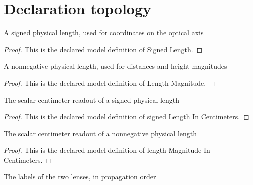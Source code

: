 \section{Declaration topology}
\begin{definition}
  \label{def:physics:phyx-mini-0043:phyxminiproblems-problemphyxmini0043-signedlength}
  A signed physical length, used for coordinates on the optical axis
\end{definition}
\begin{proof}
  This is the declared model definition of Signed Length.
\end{proof}
\begin{definition}
  \label{def:physics:phyx-mini-0043:phyxminiproblems-problemphyxmini0043-lengthmagnitude}
  A nonnegative physical length, used for distances and height magnitudes
\end{definition}
\begin{proof}
  This is the declared model definition of Length Magnitude.
\end{proof}
\begin{definition}
  \label{def:physics:phyx-mini-0043:phyxminiproblems-problemphyxmini0043-signedlengthincentimeters}
  The scalar centimeter readout of a signed physical length
\end{definition}
\begin{proof}
  This is the declared model definition of signed Length In Centimeters.
\end{proof}
\begin{definition}
  \label{def:physics:phyx-mini-0043:phyxminiproblems-problemphyxmini0043-lengthmagnitudeincentimeters}
  The scalar centimeter readout of a nonnegative physical length
\end{definition}
\begin{proof}
  This is the declared model definition of length Magnitude In Centimeters.
\end{proof}
\begin{definition}
  \label{def:physics:phyx-mini-0043:phyxminiproblems-problemphyxmini0043-lenslabel}
  The labels of the two lenses, in propagation order
\end{definition}

